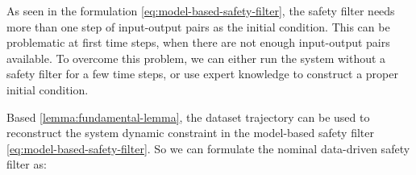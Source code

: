 \begin{remark}\label{remark:usage-output-safety-filter}
    As seen in the formulation \cref{eq:model-based-safety-filter}, the safety filter needs more than one step of input-output pairs as the initial condition.
    This can be problematic at first time steps, when there are not enough input-output pairs available.
    To overcome this problem, we can either run the system without a safety filter for a few time steps, or use expert knowledge to construct a proper initial condition.
\end{remark}

Based \cref{lemma:fundamental-lemma}, the dataset trajectory can be used to reconstruct the system dynamic constraint in the model-based safety filter \cref{eq:model-based-safety-filter}.
So we can formulate the nominal data-driven safety filter as:

